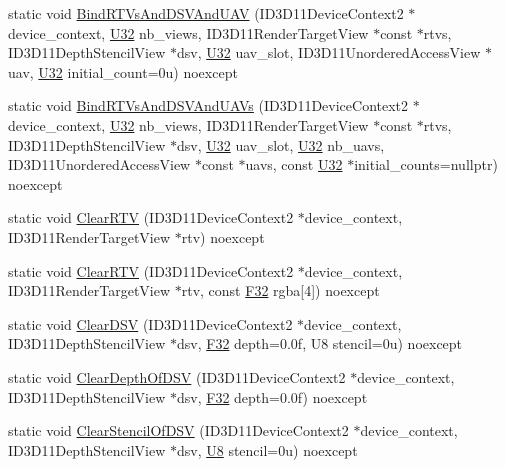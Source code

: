 \begin{DoxyCompactItemize}
\item 
static void \hyperlink{structmage_1_1_pipeline_1_1_o_m_a580a31641605827bf76022bd9792f1eb}{Bind\+R\+T\+Vs\+And\+D\+S\+V\+And\+U\+AV} (I\+D3\+D11\+Device\+Context2 $\ast$device\+\_\+context, \hyperlink{namespacemage_a41c104c036fba3756a74e19f793eeaa1}{U32} nb\+\_\+views, I\+D3\+D11\+Render\+Target\+View $\ast$const $\ast$rtvs, I\+D3\+D11\+Depth\+Stencil\+View $\ast$dsv, \hyperlink{namespacemage_a41c104c036fba3756a74e19f793eeaa1}{U32} uav\+\_\+slot, I\+D3\+D11\+Unordered\+Access\+View $\ast$uav, \hyperlink{namespacemage_a41c104c036fba3756a74e19f793eeaa1}{U32} initial\+\_\+count=0u) noexcept
\item 
static void \hyperlink{structmage_1_1_pipeline_1_1_o_m_a22221554ecef9c2e5b6097a1a4652f92}{Bind\+R\+T\+Vs\+And\+D\+S\+V\+And\+U\+A\+Vs} (I\+D3\+D11\+Device\+Context2 $\ast$device\+\_\+context, \hyperlink{namespacemage_a41c104c036fba3756a74e19f793eeaa1}{U32} nb\+\_\+views, I\+D3\+D11\+Render\+Target\+View $\ast$const $\ast$rtvs, I\+D3\+D11\+Depth\+Stencil\+View $\ast$dsv, \hyperlink{namespacemage_a41c104c036fba3756a74e19f793eeaa1}{U32} uav\+\_\+slot, \hyperlink{namespacemage_a41c104c036fba3756a74e19f793eeaa1}{U32} nb\+\_\+uavs, I\+D3\+D11\+Unordered\+Access\+View $\ast$const $\ast$uavs, const \hyperlink{namespacemage_a41c104c036fba3756a74e19f793eeaa1}{U32} $\ast$initial\+\_\+counts=nullptr) noexcept
\item 
static void \hyperlink{structmage_1_1_pipeline_1_1_o_m_a0a40eb7a844d2861e74582879afec962}{Clear\+R\+TV} (I\+D3\+D11\+Device\+Context2 $\ast$device\+\_\+context, I\+D3\+D11\+Render\+Target\+View $\ast$rtv) noexcept
\item 
static void \hyperlink{structmage_1_1_pipeline_1_1_o_m_a0e83357b9289a95ecedc6c940c26d957}{Clear\+R\+TV} (I\+D3\+D11\+Device\+Context2 $\ast$device\+\_\+context, I\+D3\+D11\+Render\+Target\+View $\ast$rtv, const \hyperlink{namespacemage_aa97e833b45f06d60a0a9c4fc22ae02c0}{F32} rgba\mbox{[}4\mbox{]}) noexcept
\item 
static void \hyperlink{structmage_1_1_pipeline_1_1_o_m_a1bc0e5e35336a2ad07bf0a5d58944788}{Clear\+D\+SV} (I\+D3\+D11\+Device\+Context2 $\ast$device\+\_\+context, I\+D3\+D11\+Depth\+Stencil\+View $\ast$dsv, \hyperlink{namespacemage_aa97e833b45f06d60a0a9c4fc22ae02c0}{F32} depth=0.\+0f, U8 stencil=0u) noexcept
\item 
static void \hyperlink{structmage_1_1_pipeline_1_1_o_m_a462b6c0240410ca05bc04097b69564bf}{Clear\+Depth\+Of\+D\+SV} (I\+D3\+D11\+Device\+Context2 $\ast$device\+\_\+context, I\+D3\+D11\+Depth\+Stencil\+View $\ast$dsv, \hyperlink{namespacemage_aa97e833b45f06d60a0a9c4fc22ae02c0}{F32} depth=0.\+0f) noexcept
\item 
static void \hyperlink{structmage_1_1_pipeline_1_1_o_m_a3be72469fce415cfb0f00f8f6e898817}{Clear\+Stencil\+Of\+D\+SV} (I\+D3\+D11\+Device\+Context2 $\ast$device\+\_\+context, I\+D3\+D11\+Depth\+Stencil\+View $\ast$dsv, \hyperlink{namespacemage_afc638980bc6154f15af5e2d93a0e0ea9}{U8} stencil=0u) noexcept
\end{DoxyCompactItemize}
